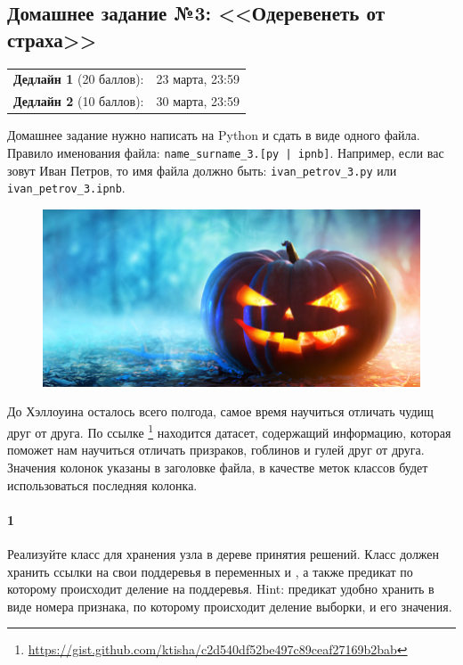 \documentclass[a4paper,12pt]{article}
\begin{document}
\subsection*{Домашнее задание №3: <<Одеревенеть от страха>>}

\begin{tabular}{@{}lr}
  \textbf{Дедлайн 1} (20 баллов): & 23 марта, 23:59 \\
  \textbf{Дедлайн 2} (10 баллов): & 30 марта, 23:59
\end{tabular}

Домашнее задание нужно написать на Python и сдать в виде одного файла.
Правило именования файла: \texttt{name\_surname\_3.[py | ipnb]}. Например, если
вас зовут Иван Петров, то имя файла должно быть: \texttt{ivan\_petrov\_3.py} или \texttt{ivan\_petrov\_3.ipnb}.

\makebox[\linewidth]{\hrulefill}

\begin{figure}[h!]
  \centering
  \includegraphics[width=.8\linewidth]{images/boo}
\end{figure}

До Хэллоуина осталось всего полгода, самое время научиться отличать чудищ друг от друга. 
По ссылке \footnote{\url{https://gist.github.com/ktisha/c2d540df52be497c89ceaf27169b2bab}} находится датасет, содержащий информацию, которая поможет нам научиться отличать призраков, гоблинов и гулей друг от друга. Значения колонок указаны в заголовке файла, в качестве меток классов будет использоваться последняя колонка. 

\paragraph{1} Реализуйте класс  для хранения узла в дереве принятия решений. Класс должен хранить ссылки на свои поддеревья в переменных  и , а также предикат по которому происходит деление на поддеревья. Hint: предикат удобно хранить в виде номера признака, по которому происходит деление выборки, и его значения. 
\end{document}
